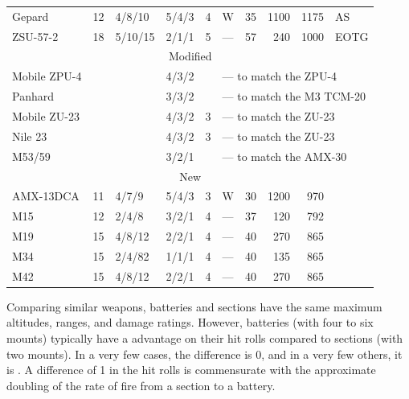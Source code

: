 {\begin{center}
\begin{tabular}{lrlllllrrl}
            Gepard&12&4/8/10&5/4/3&4&W&35&1100&1175&AS\\
            ZSU-57-2&18&5/10/15&2/1/1&5&---&57&240&1000&EOTG\\
            \midrule
            \multicolumn{10}{c}{Modified}\\
            \midrule
            Mobile ZPU-4&&&4/3/2&&\multicolumn{5}{l}{--- to match the ZPU-4}\\
            Panhard&&&3/3/2&&\multicolumn{5}{l}{--- to match the M3 TCM-20}\\
            Mobile ZU-23&&&4/3/2&3&\multicolumn{5}{l}{--- to match the ZU-23}\\
            Nile 23&&&4/3/2&3&\multicolumn{5}{l}{--- to match the ZU-23}\\
            M53/59&&&3/2/1&&\multicolumn{5}{l}{--- to match the AMX-30}\\
            \midrule
            \multicolumn{10}{c}{New}\\
            \midrule
            AMX-13DCA&11&4/7/9&5/4/3&3&W&30&1200&970&\\
            M15&12&2/4/8&3/2/1&4&---&37&120&792\\
            M19&15&4/8/12&2/2/1&4&---&40&270&865&\\
            M34&15&2/4/82&1/1/1&4&---&40&135&865&\\
            M42&15&4/8/12&2/2/1&4&---&40&270&865&\\
            \bottomrule
        \end{tabular}
        \medskip
    \end{center}

    Comparing similar weapons, batteries and sections have the same maximum altitudes, ranges, and damage ratings.
    However, batteries (with four to six mounts) typically have a  advantage on their hit rolls compared to sections (with two mounts).
    In a very few cases, the difference is 0, and in a very few others, it is .
    A difference of 1 in the hit rolls is commensurate with the approximate doubling of the rate of fire from a section to a battery.

}
